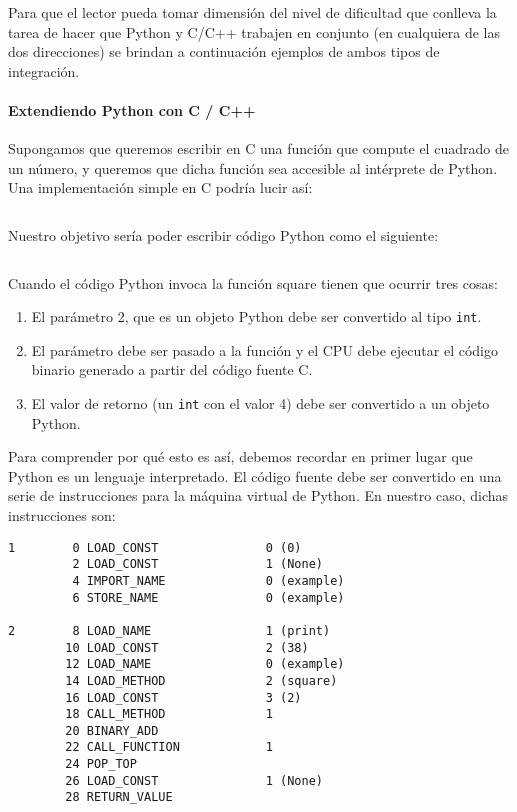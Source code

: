 Para que el lector pueda tomar dimensión del nivel de dificultad que conlleva
la tarea de hacer que Python y C/C++ trabajen en conjunto (en cualquiera de las
dos direcciones) se brindan a continuación ejemplos de ambos tipos de
integración.

\paragraph{Extendiendo Python con C / C++}

Supongamos que queremos escribir en C una función que compute el cuadrado de un
número, y queremos que dicha función sea accesible al intérprete de Python.
Una implementación simple en C podría lucir así:

\inputminted{c}{codelistings/square.cc}

Nuestro objetivo sería poder escribir código Python como el siguiente:

\inputminted{Python}{codelistings/square_usage.py}

Cuando el código Python invoca la función square tienen que ocurrir tres cosas:

\begin{enumerate}
    \item El parámetro 2, que es un objeto Python debe ser convertido al tipo
\verb!int!.

    \item El parámetro debe ser pasado a la función y el CPU debe ejecutar el
código binario generado a partir del código fuente C.

    \item El valor de retorno (un \verb!int! con el valor 4) debe ser
convertido a un objeto Python.
\end{enumerate}

Para comprender por qué esto es así, debemos recordar en primer lugar que
Python es un lenguaje interpretado. El código fuente debe ser convertido en una
serie de instrucciones para la máquina virtual de Python. En nuestro caso,
dichas instrucciones son:

\begin{verbatim}
1        0 LOAD_CONST               0 (0)
         2 LOAD_CONST               1 (None)
         4 IMPORT_NAME              0 (example)
         6 STORE_NAME               0 (example)

2        8 LOAD_NAME                1 (print)
        10 LOAD_CONST               2 (38)
        12 LOAD_NAME                0 (example)
        14 LOAD_METHOD              2 (square)
        16 LOAD_CONST               3 (2)
        18 CALL_METHOD              1
        20 BINARY_ADD
        22 CALL_FUNCTION            1
        24 POP_TOP
        26 LOAD_CONST               1 (None)
        28 RETURN_VALUE
\end{verbatim}


